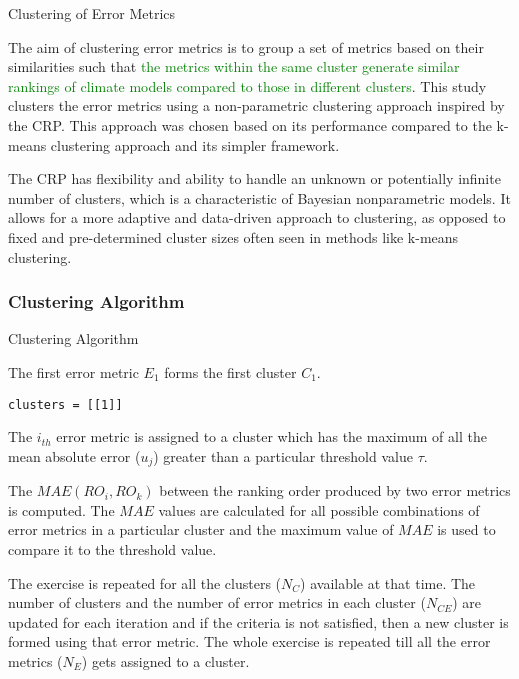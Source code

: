\documentclass[xcolor={dvipsnames}]{beamer}
\begin{document}
\begin{frame}{Clustering of Error Metrics}

The aim of clustering error metrics is to group a set of metrics based on their similarities such that \textcolor{green}{the metrics within the same cluster generate similar rankings of climate models compared to those in different clusters}. This study clusters the error metrics using a non-parametric clustering approach inspired by the CRP. This approach was chosen based on its performance compared to the k-means clustering approach and its simpler framework.

\hfill

\pause

The CRP has flexibility and ability to handle an unknown or potentially infinite number of clusters, which is a characteristic of Bayesian nonparametric models. It allows for a more adaptive and data-driven approach to clustering, as opposed to fixed and pre-determined cluster sizes often seen in methods like k-means clustering.
    
\end{frame}

\subsubsection{Clustering Algorithm}

\begin{frame}[fragile]{Clustering Algorithm}


The first error metric $E_1$ forms the first cluster $C_1$.

\begin{verbatim}
clusters = [[1]]
\end{verbatim}

\hfill

The $i_{th}$ error metric is assigned to a cluster which has the maximum of all the mean absolute error ($u_j$) greater than a particular threshold value $\tau$.


\hfill

The $MAE(RO_i, RO_k)$ between the ranking order produced by two error metrics is computed. The $MAE$ values are calculated for all possible combinations of error metrics in a particular cluster and the maximum value of $MAE$ is used to compare it to the threshold value.

\hfill

The exercise is repeated for all the clusters ($N_C$) available at that time. The number of clusters and the number of error metrics in each cluster ($N_{CE}$) are updated for each iteration and if the criteria is not satisfied, then a new cluster is formed using that error metric. The whole exercise is repeated till all the error metrics ($N_E$) gets assigned to a cluster.

\end{frame}
\end{document}
